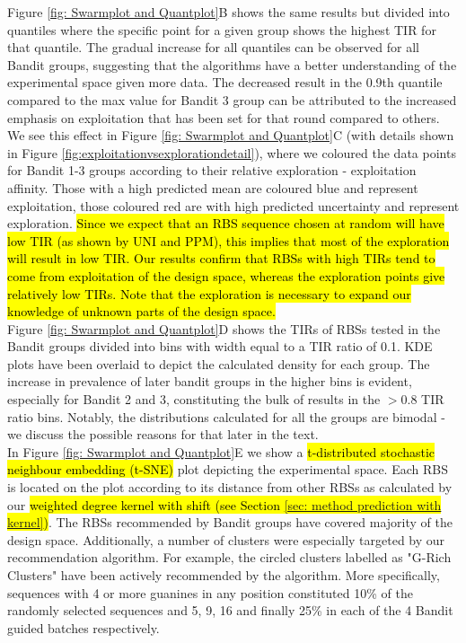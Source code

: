 \documentclass{article}
\begin{document}
Figure \ref{fig: Swarmplot and Quantplot}B shows the same results but divided into quantiles where the specific point for a given group shows the highest TIR for that quantile.
The gradual increase for all quantiles can be observed for all Bandit groups, suggesting that the algorithms have a better understanding of the experimental space given more data.
The decreased result in the 0.9th quantile compared to the max value for Bandit 3 group can be attributed to the increased emphasis on exploitation that has been set for that round compared to others.
We see this effect in Figure \ref{fig: Swarmplot and Quantplot}C (with details shown in Figure  \ref{fig:exploitationvsexplorationdetail}), where we coloured the data points for Bandit 1-3 groups according to their relative exploration - exploitation affinity.
Those with a high predicted mean are coloured blue and represent exploitation, those coloured red are with high predicted uncertainty and represent exploration.
\hl{Since we expect that an RBS sequence chosen at random will have low TIR
(as shown by UNI and PPM), this implies that most of the exploration will result in low TIR.
Our results confirm that
RBSs with high TIRs tend to come from exploitation of the design space,
whereas the exploration points give relatively low TIRs. Note that the exploration is necessary to expand our knowledge of unknown parts of the design space.}\\

Figure \ref{fig: Swarmplot and Quantplot}D shows the TIRs of RBSs tested in the Bandit groups divided into bins with width equal to a TIR ratio of 0.1.
KDE plots have been overlaid to depict the calculated density for each group.
The increase in prevalence of later bandit groups in the higher bins is evident, especially for Bandit 2 and 3, constituting the bulk of results in the $>0.8$ TIR ratio bins.
Notably, the distributions calculated for all the groups are bimodal - we discuss the possible reasons for that later in the text.\\

In Figure \ref{fig: Swarmplot and Quantplot}E we show a \hl{t-distributed stochastic neighbour embedding (t-SNE)} plot depicting the experimental space.
Each RBS is located on the plot according to its distance from other RBSs as calculated by our \hl{weighted degree kernel with shift (see Section \mbox{\ref{sec: method prediction with kernel}})}.
The RBSs recommended by Bandit groups have covered majority of the design space.
Additionally, a number of clusters were especially targeted by our recommendation algorithm.
For example, the circled clusters labelled as "G-Rich Clusters" have been actively recommended by the algorithm.
More specifically, sequences with 4 or more guanines in any position constituted 10\% of the randomly selected sequences and 5, 9, 16 and finally 25\% in each of the 4 Bandit guided batches respectively.
\end{document}
